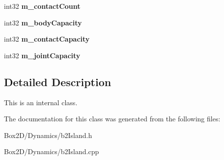 \begin{DoxyCompactItemize}
$$int32 {\bfseries m\+\_\+contact\+Count}
\item 
\mbox{\label{classb2_island_a5ea371889bb93fb6387ff2ab427191ed}} 
int32 {\bfseries m\+\_\+body\+Capacity}
\item 
\mbox{\label{classb2_island_a1a65b8fc8256ca443f85e6ae6f2d841a}} 
int32 {\bfseries m\+\_\+contact\+Capacity}
\item 
\mbox{\label{classb2_island_a9b6e63c89307d469e1075585d65a9bbb}} 
int32 {\bfseries m\+\_\+joint\+Capacity}
\end{DoxyCompactItemize}


\subsection{Detailed Description}
This is an internal class. 

The documentation for this class was generated from the following files\+:\begin{DoxyCompactItemize}
\item 
Box2\+D/\+Dynamics/b2\+Island.\+h\item 
Box2\+D/\+Dynamics/b2\+Island.\+cpp\end{DoxyCompactItemize}

